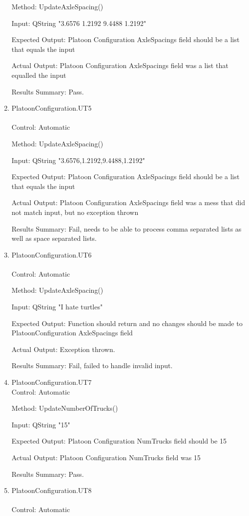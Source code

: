 \documentclass[12pt, titlepage]{article}
\begin{document}
\begin{enumerate}
  Method: UpdateAxleSpacing()

  Input: QString "3.6576 1.2192 9.4488 1.2192"

  Expected Output: Platoon Configuration AxleSpacings field should be a list that equals the input

  Actual Output: Platoon Configuration AxleSpacings field was a list that equalled the input

  Results Summary: Pass.
\item{PlatoonConfiguration.UT5}\\\\
  Control: Automatic

  Method: UpdateAxleSpacing()

  Input: QString "3.6576,1.2192,9.4488,1.2192"

  Expected Output: Platoon Configuration AxleSpacings field should be a list that equals the input

  Actual Output: Platoon Configuration AxleSpacings field was a mess that did not match input, but no exception thrown

  Results Summary: Fail, needs to be able to process comma separated lists as well as space separated lists.
  \item{PlatoonConfiguration.UT6}\\\\
  Control: Automatic

  Method: UpdateAxleSpacing()

  Input: QString "I hate turtles"

  Expected Output: Function should return and no changes should be made to PlatoonConfiguration AxleSpacings field

  Actual Output: Exception thrown.

  Results Summary: Fail, failed to handle invalid input.
  \item{PlatoonConfiguration.UT7}\label{PlatoonConfiguration.UT7}\\
  
  Control: Automatic

  Method: UpdateNumberOfTrucks()

  Input: QString "15"

  Expected Output: Platoon Configuration NumTrucks field should be 15

  Actual Output: Platoon Configuration NumTrucks field was 15

  Results Summary: Pass.
\item{PlatoonConfiguration.UT8}\\\\
  Control: Automatic


\end{enumerate}
\end{document}
